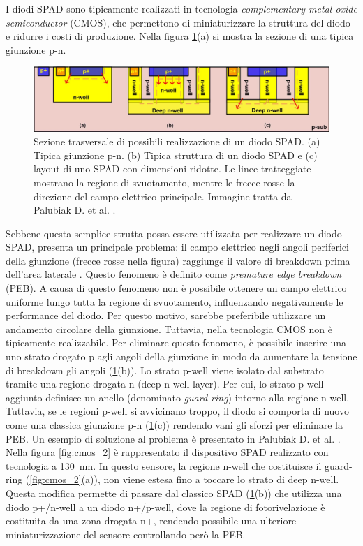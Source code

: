 I diodi SPAD sono tipicamente realizzati in tecnologia \textit{complementary metal-oxide semiconductor} (CMOS), che permettono di miniaturizzare la struttura del diodo e ridurre i costi di produzione. Nella figura \ref{fig:cmos}(a) si mostra la sezione di una tipica giunzione p-n.
\begin{figure}[b]
	\centering
	\includegraphics[width=0.8\linewidth]{./ImageFiles/cmos.jpg}
	\caption{Sezione trasversale di possibili realizzazione di un diodo SPAD. (a) Tipica giunzione p-n. (b) Tipica struttura di un diodo SPAD e (c) layout di uno SPAD con dimensioni ridotte. Le linee tratteggiate mostrano la regione di svuotamento, mentre le frecce rosse la direzione del campo elettrico principale. Immagine tratta da Palubiak D. et al. \cite{Palubiak2011}.}
	\label{fig:cmos}
\end{figure} 
Sebbene questa semplice strutta possa essere utilizzata per realizzare un diodo SPAD, presenta un principale problema: il campo elettrico negli angoli periferici della giunzione (frecce rosse nella figura) raggiunge il valore di breakdown prima dell'area laterale \cite{Palubiak2011}. Questo fenomeno è definito come \textit{premature edge breakdown} (PEB). A causa di questo fenomeno non è possibile ottenere un campo elettrico uniforme lungo tutta la regione di svuotamento, influenzando negativamente le performance del diodo. Per questo motivo, sarebbe preferibile utilizzare un andamento circolare della giunzione. Tuttavia, nella tecnologia CMOS non è tipicamente realizzabile. Per eliminare questo fenomeno, è possibile inserire una uno strato drogato p agli angoli della giunzione in modo da aumentare la tensione di breakdown gli angoli (\Fig\ref{fig:cmos}(b)). Lo strato p-well viene isolato dal substrato tramite una regione drogata n (deep n-well layer). Per cui, lo strato p-well aggiunto definisce un anello (denominato \textit{guard ring}) intorno alla regione n-well. Tuttavia, se le regioni p-well si avvicinano troppo, il diodo si comporta di nuovo come una classica giunzione p-n (\Fig\ref{fig:cmos}(c)) rendendo vani gli sforzi per eliminare la PEB. Un esempio di soluzione al problema è presentato in Palubiak D. et al. \cite{Palubiak2011}. Nella figura \ref{fig:cmos_2} è rappresentato il dispositivo SPAD realizzato con tecnologia a \SI{130}{\nano\meter}. In questo sensore, la regione n-well che costituisce il guard-ring (\Fig\ref{fig:cmos_2}(a)), non viene estesa fino a toccare lo strato di deep n-well. Questa modifica permette di passare dal classico SPAD (\Fig\ref{fig:cmos}(b)) che utilizza una diodo p+/n-well a un diodo n+/p-well, dove la regione di fotorivelazione è costituita da una zona drogata n+, rendendo possibile una ulteriore miniaturizzazione del sensore controllando però la PEB.
